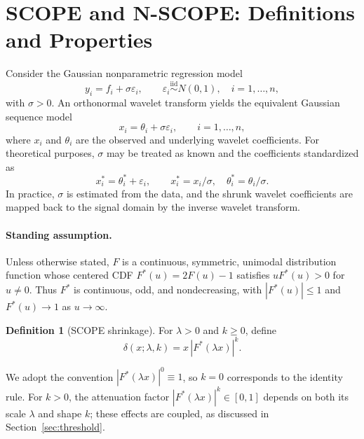 \documentclass[12pt]{article}
\theoremstyle{definition}
\theoremstyle{definition}
\newtheorem{definition}{Definition}
\begin{document}
\section{SCOPE and N-SCOPE: Definitions and Properties}
\label{sec:defs}

Consider the Gaussian nonparametric regression model
\begin{equation}
y_i=f_i+\sigma\varepsilon_i,\qquad
\varepsilon_i\stackrel{\mathrm{iid}}{\sim}N(0,1),\quad i=1,\ldots,n,
\label{eq:scope_np_reg}
\end{equation}
with $\sigma>0$. An orthonormal wavelet transform yields the equivalent
Gaussian sequence model
\begin{equation}
x_i=\theta_i+\sigma\varepsilon_i,\qquad i=1,\ldots,n,
\label{eq:scope_gauss_seq}
\end{equation}
where $x_i$ and $\theta_i$ are the observed and underlying wavelet
coefficients. For theoretical purposes, $\sigma$ may be treated as
known and the coefficients standardized as
\begin{equation}
x_i^*=\theta_i^*+\varepsilon_i,\qquad
x_i^*=x_i/\sigma,\quad \theta_i^*=\theta_i/\sigma.
\label{eq:scope_gauss_seq_std}
\end{equation}
In practice, $\sigma$ is estimated from the data, and the shrunk wavelet
coefficients are mapped back to the signal domain by the inverse
wavelet transform.

\paragraph{Standing assumption.}
Unless otherwise stated, $F$ is a continuous, symmetric, unimodal
distribution function whose centered CDF $F^*(u)=2F(u)-1$ satisfies
$uF^*(u)>0$ for $u\ne0$. Thus $F^*$ is continuous, odd, and
nondecreasing, with $|F^*(u)|\le1$ and $F^*(u)\to1$ as $u\to\infty$.

\begin{definition}[SCOPE shrinkage]
For $\lambda>0$ and $k\ge0$, define
\begin{equation}
\delta(x;\lambda,k)=x\,|F^*(\lambda x)|^k.
\label{eq:scope_def}
\end{equation}
\end{definition}

We adopt the convention $|F^*(\lambda x)|^0\equiv1$, so $k=0$
corresponds to the identity rule. For $k>0$, the attenuation factor
$|F^*(\lambda x)|^k\in[0,1]$ depends on both its scale $\lambda$
and shape $k$; these effects are coupled, as discussed in
Section~\ref{sec:threshold}.
\end{document}
